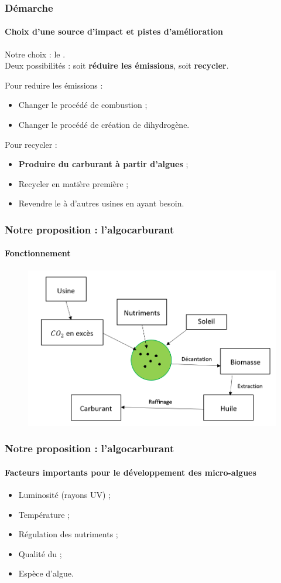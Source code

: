 \documentclass{beamer}
\begin{document}
		\begin{frame}
		\frametitle{Démarche}
		\framesubtitle{Choix d'une source d'impact et pistes d'amélioration} %
		Notre choix : le .\\
		Deux possibilités : soit \textbf{réduire les émissions}, soit \textbf{recycler}.
		
		Pour reduire les émissions :
		\begin{itemize}
			\item Changer le procédé de combustion ;
			\item Changer le procédé de création de dihydrogène.
		\end{itemize}
		Pour recycler :
		\begin{itemize}
			\item \textbf{Produire du carburant à partir d'algues} ;
			\item Recycler en matière première ;
			\item Revendre le  à d'autres usines
			en ayant besoin.
		\end{itemize}
	\end{frame}
	
	\begin{frame}
		\frametitle{Notre proposition : l'algocarburant}
		\framesubtitle{Fonctionnement}
		\begin{figure}
			\centering
			\includegraphics[scale=0.6]{media/fonctionnement.png}
		\end{figure}
	\end{frame}
	
	\begin{frame}
		\frametitle{Notre proposition : l'algocarburant}
		\framesubtitle{Facteurs importants pour le développement des micro-algues}
		\Large{\begin{itemize}
			\item Luminosité (rayons UV) ;
			\item Température ;
			\item Régulation des nutriments ;
			\item Qualité du \chemform{CO_2} ;
			\item Espèce d'algue.
		\end{itemize}}
	\end{frame}
	
\end{document}
